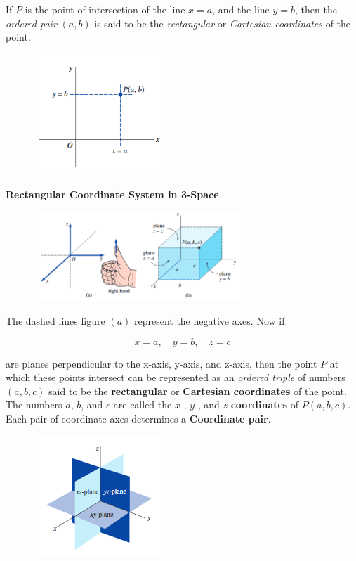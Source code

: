 \documentclass{article}
\begin{document}
If $P$ is the point of intersection of the line $x=a$, and the line $y=b$, then the \textit{ordered pair} $(a,b)$ is said to be the \textit{rectangular} or \textit{Cartesian coordinates} of the point.


\begin{figure}[H]
  \includegraphics[width=5cm]{images/figure14.PNG}
  \centering
\end{figure}


\textbf{Rectangular Coordinate System in 3-Space}\vspace{0.5cm}

\begin{figure}[H]
  \includegraphics[width=8cm]{images/figure15.PNG}
  \centering
\end{figure}

The dashed lines figure $(a)$  represent the negative axes. Now if:

\[x = a, \quad y = b, \quad z = c\]

are planes perpendicular to the x-axis, y-axis, and z-axis, then the point $P$ at which these points intersect can be represented as an \textit{ordered triple} of numbers $(a,b,c)$ said to be the \textbf{rectangular} or \textbf{Cartesian coordinates} of the point.\\

The numbers $a$, $b$, and $c$ are called the $x$-, $y$-, and $z$-\textbf{coordinates} of $P(a,b,c)$.\\

Each pair of coordinate axes determines a \textbf{Coordinate pair}.

\begin{figure}[H]
  \includegraphics[width=5cm]{images/figure16.PNG}
  \centering
\end{figure}
\end{document}

